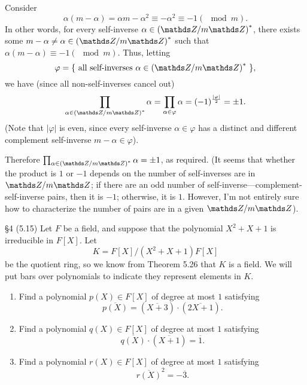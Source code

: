 \documentclass{homework}
\begin{document}
\begin{solution}
\begin{enumerate}[label=(\alph*)]
      Consider \[
        \alpha(m-\alpha)=\alpha m-\alpha^2\equiv-\alpha^2\equiv-1(\mod{m})
      .\] In other words, for every self-inverse $\alpha\in \left( \Z / m\Z \right)^*$, there exists
      some $m-\alpha\neq \alpha\in \left( \Z / m\Z \right)^*$ such that
      $\alpha(m-\alpha)\equiv-1(\mod{m})$. Thus, letting \[
        \varphi=\{ ~\text{all self-inverses $\alpha\in \left( \Z / m\Z \right)^*$}~ \}
      ,\] we have (since all non-self-inverses cancel out) \[
      \prod_{\alpha\in \left( \Z / m\Z \right)^*} \alpha=\prod_{\alpha\in \varphi}
      \alpha=(-1)^{\frac{\left| \varphi \right|}{2}}=\pm 1
    .\] (Note that $\left| \varphi \right| $ is even, since every self-inverse $\alpha\in \varphi$
    has a distinct and different complement self-inverse $m-\alpha\in \varphi$).

    Therefore $\prod_{\alpha\in \left( \Z / m\Z \right)^*} \alpha=\pm 1$, as required. (It seems
    that whether the product is $1$ or $-1$ depends on the number of self-inverses are in $\Z /
    m\Z$; if there are an odd number of self-inverse---complement-self-inverse pairs, then it is
    $-1$; otherwise, it is $1$. However, I'm not entirely sure how to characterize the number of
    pairs are in a given $\Z / m\Z$).
  \end{enumerate}
\end{solution}

\begin{problem}{\S 4}
  (5.15) Let $F$ be a field, and suppose that the polynomial $X^2+X+1$ is irreducible in $F[X]$. Let
  \[
    K = F[X] / (X^2+X+1)F[X]
  \] be the quotient ring, so we know from Theorem 5.26 that $K$ is a field. We will put bars over
  polynomials to indicate they represent elements in $K$.
  \begin{enumerate}[label=(\alph*)]
    \item Find a polynomial $p(X)\in F[X]$ of degree at most $1$ satisfying \[
        \overline{p(X)}=(\overline{X+3})\cdot (\overline{2X+1})
      .\] 
    \item Find a polynomial $q(X)\in F[X]$ of degree at most $1$ satisfying \[
        \overline{q(X)}\cdot (\overline{X+1})=\overline{1}
      .\] 
    \item Find a polynomial $r(X)\in F[X]$ of degree at most $1$ satisfying \[
        \overline{r(X)}^2=-\overline{3}
    .\] 
  \end{enumerate}
\end{problem}
\end{document}
